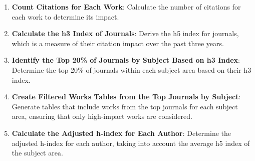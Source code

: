 %
\begin{enumerate}
    \item \textbf{Count Citations for Each Work}: Calculate the number of citations for each work to determine its impact.

    \item \textbf{Calculate the h3 Index of Journals}: Derive the h5 index for journals, which is a
          measure of their citation impact over the past three years.

    \item \textbf{Identify the Top 20\% of Journals by Subject Based on h3 Index}: Determine the top 20\% of journals within
          each subject area based on their h3 index.

    \item \textbf{Create Filtered Works Tables from the Top Journals by Subject}: Generate tables that include works from the
          top journals for each subject area, ensuring that only high-impact works are considered.


    \item \textbf{Calculate the Adjusted h-index for Each Author}: Determine the adjusted h-index for each author,
          taking into account the average h5 index of the subject area.
\end{enumerate}

